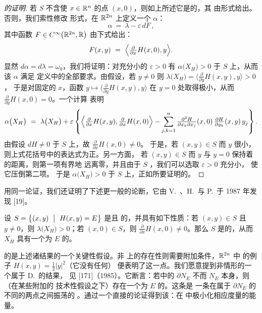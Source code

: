 \begin{proof}[\trhLemma{}的证明]
若 $S$ 不含使 $x\in\mathbb{R}^{n}$ 的点 $(x,0)$，则如上所述它是\trContactType{}的，其%
\trContactStructure{}由\trLiouville{}形式给出。否则，我们索性修改%
\trLiouville{}形式，在 $\mathbb{R}^{2n}$ 上定义一个\trOneForm{} $\alpha$：
\[
\alpha\ =\ \lambda-\varepsilon\,dF\,,
\]
其中函数 $F\in C^{\infty}\bigl(\mathbb{R}^{2n},\mathbb{R}\bigr)$ 由下式给出：
\[
F(x,y)\ =\ \Bigl\langle\tfrac{\partial}{\partial x}H(x,0),y\Bigr\rangle.
\]
显然 $d\alpha=d\lambda=\omega_{0}$，我们将证明：对充分小的 $\varepsilon>0$ 有%
$\alpha\bigl(X_{H}\bigr)>0$ 于 $S$ 上，从而该\trOneForm{} $\alpha$ 满足%
\trContactType{}定义中的全部要求。由假设，若 $y\neq0$ 则%
$\lambda\bigl(X_{H}\bigr)=\bigl\langle\tfrac{\partial}{\partial y}H(x,y),y\bigr\rangle>0$，%
于是对固定的 $x$，函数 $y\mapsto\bigl\langle\tfrac{\partial}{\partial y}H(x,y),y\bigr\rangle$%
在 $y=0$ 处取得极小，从而 $\tfrac{\partial}{\partial y}H(x,0)=0$。一个计算%
表明
\[
\alpha\bigl(X_{H}\bigr)\ =\ \lambda\bigl(X_{H}\bigr)+\varepsilon\left\{%
\Bigl\langle\tfrac{\partial}{\partial x}H(x,y),\tfrac{\partial}{\partial x}H(x,0)\Bigr\rangle-%
\sum_{j,k=1}^{n}\tfrac{\partial^{2}H}{\partial x_{k}\partial x_{j}}(x,0)\,%
\tfrac{\partial H}{\partial y_{k}}(x,y)\,y_{j}\right\}.
\]
由假设 $dH\neq0$ 于 $S$ 上，故 $\tfrac{\partial}{\partial x}H(x,0)\neq0$。%
于是，若 $(x,y)\in S$ 而 $y$ 很小，则上式花括号中的表达式为正。另一方面，%
若 $(x,y)\in S$ 而 $y$ 与 $y=0$ 保持着\trBounded{}的距离，则第一项有界地%
远离零，并且由于 $S$ \trCompact，我们可以选取 $\varepsilon>0$ 充分小，%
使它压倒第二项。%
于是 $\alpha\bigl(X_{H}\bigr)>0$ 于 $S$ 上，正如所要证明的。
\end{proof}

用同一论证，我们还证明了下述更一般的论断，它由 V.~\trBenci、H.~\trHofer{}与%
P.~\trRabinowitz{}于 1987 年发现 [19]。

\begin{theorem}\label{thm:benci-hofer-rabinowitz}
设\trEnergySurface{} $S=\bigl\{(x,y)\ \bigm|\ H(x,y)=E\bigr\}$ 是\trCompact{}且%
\trRegular{}的，并具有如下性质：若 $(x,y)\in S$ 且 $y\neq0$，则%
$\lambda\bigl(X_{H}\bigr)>0$；若 $(x,0)\in S$，则%
$\tfrac{\partial}{\partial x}H(x,0)\neq0$。那么 $S$ 是\trContactType{}的，从而%
$X_{H}$ 具有一个\trEnergy{}为 $E$ 的\trPeriodicSolution。
\end{theorem}

\trEnergySurface{}的\trCompactness{}是上述诸结果的一个关键性假设。非\trCompact%
\trEnergySurface{}上\trPeriodicSolution{}的存在性则需要附加条件，$\mathbb{R}^{2n}$ 中%
的例子 $H(x,y)=\tfrac{1}{2}\lvert y\rvert^{2}$（它没有任何\trPeriodicSolution）%
便表明了这一点。我们愿意提到非\trCompact{}情形的一个属于 D.~\trOffin{}的结果，%
见 [171]（1985）。它断言：若\trConfigurationSpace{}中的\trBoundary{}%
$\partial N_{E}$ 不\trConnected{}而 $N_{E}$ 本身\trConnected，则（在某些附加的%
技术性假设之下）存在一个\trEnergy{}为 $E$ 的\trPeriodicOrbit。这条\trOrbit{}是%
一条在属于 $\partial N_{E}$ 的不同\trConnectedComponent{}的两点之间振荡的%
\trBrakeOrbit。\trOffin{}通过一个直接的\trVariational{}论证得到该\trPeriodicOrbit：在%
\trConfigurationSpace{}中极小化相应\trJacobi{}度量的能量\trIntegral。

